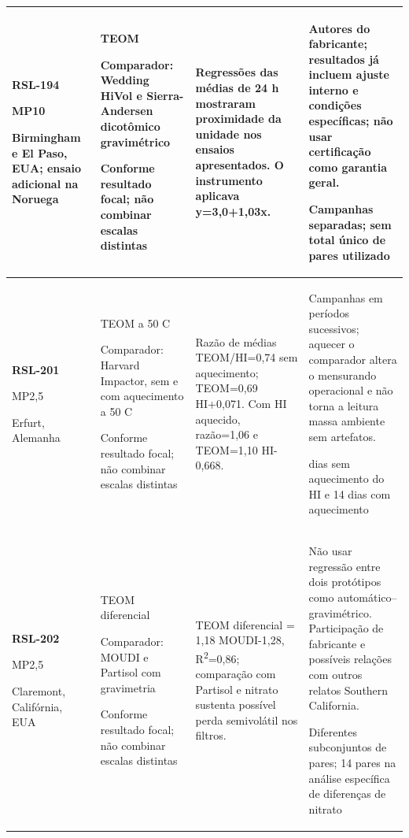 \begin{longtable}{|P{0.18\textwidth}|P{0.25\textwidth}|P{0.28\textwidth}|P{\arrayrulewidth\relax}|}
\textbf{RSL-194}\par\textcite{rsl194}\par MP10\par Birmingham e El Paso, EUA; ensaio adicional na Noruega & TEOM\par\medskip Comparador: Wedding HiVol e Sierra-Andersen dicotômico gravimétrico\par\medskip Conforme resultado focal; não combinar escalas distintas & Regressões das médias de 24 h mostraram proximidade da unidade nos ensaios apresentados. O instrumento aplicava y=3,0+1,03x. & Autores do fabricante; resultados já incluem ajuste interno e condições específicas; não usar certificação como garantia geral.\par\medskip Campanhas separadas; sem total único de pares utilizado\\\hline
\textbf{RSL-201}\par\textcite{rsl201}\par MP2,5\par Erfurt, Alemanha & TEOM a 50 \textdegree{}C\par\medskip Comparador: Harvard Impactor, sem e com aquecimento a 50 \textdegree{}C\par\medskip Conforme resultado focal; não combinar escalas distintas & Razão de médias TEOM/HI=0,74 sem aquecimento; TEOM=0,69 HI+0,071. Com HI aquecido, razão=1,06 e TEOM=1,10 HI-0,668. & Campanhas em períodos sucessivos; aquecer o comparador altera o mensurando operacional e não torna a leitura massa ambiente sem artefatos.\par{} dias sem aquecimento do HI e 14 dias com aquecimento\\\hline
\textbf{RSL-202}\par\textcite{rsl202}\par MP2,5\par Claremont, Califórnia, EUA & TEOM diferencial\par\medskip Comparador: MOUDI e Partisol com gravimetria\par\medskip Conforme resultado focal; não combinar escalas distintas & TEOM diferencial = 1,18 MOUDI-1,28, R\textsuperscript{2}=0,86; comparação com Partisol e nitrato sustenta possível perda semivolátil nos filtros. & Não usar regressão entre dois protótipos como automático--gravimétrico. Participação de fabricante e possíveis relações com outros relatos Southern California.\par\medskip Diferentes subconjuntos de pares; 14 pares na análise específica de diferenças de nitrato\\\hline

\end{longtable}
